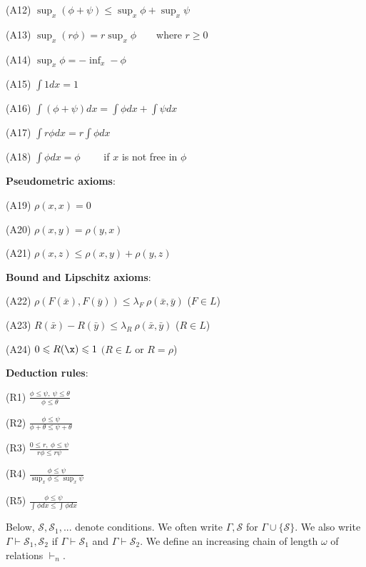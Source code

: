 \documentclass[12pt]{article}
\def\Sc{\mathcal S}
\begin{document}
(A12) $\sup_x(\phi+\psi)\leqslant\sup_x\phi+\sup_x\psi$

(A13) $\sup_x(r\phi)=r\sup_x\phi$\ \ \ \ where $r\geqslant 0$

(A14) $\sup_x\phi=-\inf_x-\phi$

(A15) $\int 1 dx=1$

(A16) $\int(\phi+\psi)dx=\int\phi dx+\int\psi dx$

(A17) $\int r\phi dx=r\int\phi dx$

(A18) $\int\phi dx=\phi$ \ \ \ \ if $x$ is not free in $\phi$
\vspace{1mm}

{\bf Pseudometric axioms}:

(A19)  $\rho(x,x)=0$

(A20) $\rho(x,y)=\rho(y,x)$

(A21) $\rho(x,z)\leqslant \rho(x,y)+\rho(y,z)$
\vspace{1mm}

{\bf Bound and Lipschitz axioms}:

(A22) $\rho(F(\bar{x}),F(\bar{y}))\leqslant\lambda_F\ \rho(\bar{x},\bar{y})$ \hspace{10mm} ($F\in L$)

(A23) $R(\bar{x})-R(\bar{y})\leqslant\lambda_R\ \rho(\bar{x},\bar{y})$ \hspace{12mm} ($R\in L$)

(A24) $0\leqslant R(\x)\leqslant1$ \hspace{26mm} $(R\in L$ or $R=\rho$)
\vspace{1mm}

{\bf Deduction rules}: \vspace{1mm}

(R1) $\frac{\phi\leqslant\psi,\ \psi\leqslant\theta}{\phi\leqslant\theta}$ \vspace{2mm}

(R2) $\frac{\phi\leqslant\psi}{\phi+\theta\leqslant\psi+\theta}$ \vspace{2mm}

(R3) $\frac{0\leqslant r,\ \phi\leqslant\psi}{r\phi\leqslant r\psi}$ \vspace{2mm}

(R4) $\frac{\phi\leqslant\psi}{\sup_x\phi\leqslant\sup_x\psi}$ \vspace{2mm}

(R5) $\frac{\phi\leqslant\psi}{\int\phi dx\leqslant\int\phi dx}$ \vspace{2mm}
\bigskip

Below, $\Sc,\Sc_1,...$ denote conditions.
We often write $\Gamma,\Sc$ for $\Gamma\cup\{\Sc\}$. We also write $\Gamma\vdash\Sc_1,\Sc_2$
if $\Gamma\vdash\Sc_1$ and $\Gamma\vdash\Sc_2$.
We define an increasing chain of length $\omega$ of relations $\vdash_n$.
\end{document}
